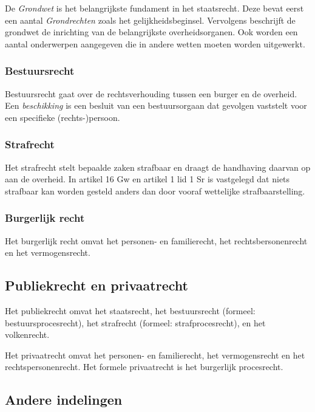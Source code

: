 \documentclass{article}
\begin{document}
De \emph{Grondwet} is het belangrijkste fundament in het staatsrecht. Deze
bevat eerst een aantal \emph{Grondrechten} zoals het gelijkheidsbeginsel.
Vervolgens beschrijft de grondwet de inrichting van de belangrijkste
overheidsorganen. Ook worden een aantal onderwerpen aangegeven die in andere
wetten moeten worden uitgewerkt. 

\subsubsection{Bestuursrecht}

Bestuursrecht gaat over de rechtsverhouding tussen een burger en de overheid.
Een \emph{beschikking} is een besluit van een bestuursorgaan dat gevolgen
vaststelt voor een specifieke (rechts-)persoon.

\subsubsection{Strafrecht}

Het strafrecht stelt bepaalde zaken strafbaar en draagt de handhaving daarvan
op aan de overheid. In artikel 16 Gw en artikel 1 lid 1 Sr is vastgelegd dat
niets strafbaar kan worden gesteld anders dan door vooraf wettelijke
strafbaarstelling.

\subsubsection{Burgerlijk recht}

Het burgerlijk recht omvat het personen- en familierecht, het
rechtsbersonenrecht en het vermogensrecht. 

\subsection{Publiekrecht en privaatrecht}

Het publiekrecht omvat het staatsrecht, het bestuursrecht (formeel:
bestuursprocesrecht), het strafrecht (formeel: strafprocesrecht), en het
volkenrecht.

Het privaatrecht omvat het personen- en familierecht, het vermogensrecht en het
rechtspersonenrecht. Het formele privaatrecht is het burgerlijk procesrecht.

\subsection{Andere indelingen}
\end{document}
